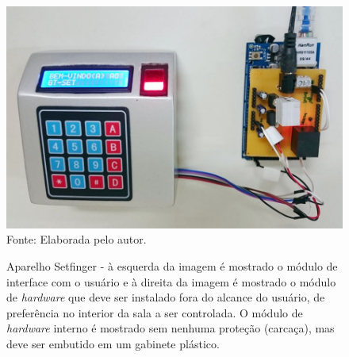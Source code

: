 \begin{figure}[!t]
  \begin{center}
  \caption{Aparelho Setfinger - à esquerda da imagem é mostrado o módulo de interface com o usuário e à direita da imagem é mostrado o módulo de \textit{hardware} que deve ser instalado fora do alcance do usuário, de preferência no interior da sala a ser controlada. O módulo de \textit{hardware} interno é mostrado sem nenhuma proteção (carcaça), mas deve ser embutido em um gabinete plástico.}
  \includegraphics[scale=0.4]{figuras/cap4/setfinger_modulos.jpg}\\
  Fonte: Elaborada pelo autor.
  \label{setfinger_modulos}
  \end{center}
  \end{figure}
  
  
  
